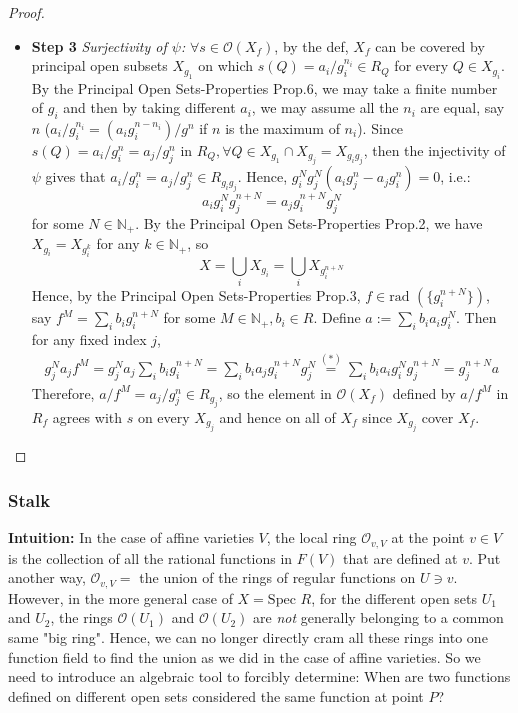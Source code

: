 \begin{proof}
\begin{itemize}
        \item \textbf{Step 3} \textit{Surjectivity of $\psi$:} $\forall s\in \mathcal{O} (X_f)$, by the def, $X_f$ can be covered by principal open subsets $X_{g_1}$ on which $s (Q) =a_i/g_i^{n_i} \in R_Q$ for every $Q\in X_{g_i}$. By the Principal Open Sets-Properties Prop.6, we may take a finite number of $g_i$ and then by taking different $a_i$, we may assume all the $n_i$ are equal, say $n$ ($a_i/g_i ^{n_i} =(a_ig_i^{n-n_i}) / g^n$ if $n$ is the maximum of $n_i$). Since $s(Q) =a_i/g_i^n= a_j/g_j^n$ in $R_Q ,\forall Q\in X_{g_1} \cap X_{g_j} = X_{g_ig_j}$, then the injectivity of $\psi$ gives that $a_i/g_i^n= a_j/g_j^n \in R_{g_ig_j}$. Hence, $g_i^Ng_j^N (a_ig_j^n- a_jg_i^n)=0$, i.e.:
        \begin{equation*}
            a_ig_i^Ng_j^{n+N} = a_jg_i^{n+N} g_j^N \tag{*}
        \end{equation*}
        for some $N\in \mathbb{N}_+$. By the Principal Open Sets-Properties Prop.2, we have $X_{g_i} = X_{g_i^k}$ for any $k \in \mathbb{N}_+$, so
        $$X=\bigcup_i X_{g_i} = \bigcup_{i} X_{g_i^{n+N}}$$
        Hence, by the Principal Open Sets-Properties Prop.3, $f\in \text{rad } (\{g_i^{ n+N} \})$, say $f^M= \sum_i b_ig_i^{n+N}$ for some $M \in \mathbb{N}_+,b_i \in R$. Define $a:= \sum_ib_ia_ig_i^N$. Then for any fixed index $j$,
        \begin{align*}
            g_j^Na_j f^M= g_j^Na_j \sum_{i} b_ig_i^{n+N} = \sum_i b_ia_jg_i^{n+N} g_j^N \overset{ (*)}{=} \sum_i b_ia_ig_i^N g_j^{n+N} = g_j^{n+N}a
        \end{align*}
        Therefore, $a/f^M= a_j/g_j^n \in R_{g_j}$, so the element in $\mathcal{O} (X_f)$ defined by $a/f^M$ in $R_f$ agrees with $s$ on every $X_{g_j}$ and hence on all of $X_f$ since $X_{g_j}$ cover $X_f$.
    \end{itemize}
\end{proof}


\subsubsection{Stalk}

\noindent\textbf{Intuition:} In the case of affine varieties $V$, the local ring $\mathcal{O}_{v,V}$ at the point $v\in V$ is the collection of all the rational functions in $F(V)$ that are defined at $v$. Put another way, $\mathcal{O}_{v,V}=$ the union of the rings of regular functions on $U\ni v$.\\
However, in the more general case of $X=\text{Spec }R$, for the different open sets $U_1$ and $U_2$, the rings $\mathcal{O}(U_1)$ and $\mathcal{O} (U_2)$ are \textit{not} generally belonging to a common same "big ring". Hence, we can no longer directly cram all these rings into one function field to find the union as we did in the case of affine varieties. So we need to introduce an algebraic tool to forcibly determine: When are two functions defined on different open sets considered the same function at point $P$?\\

